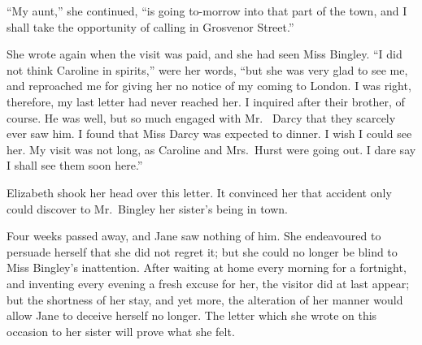 ``My aunt,'' she continued, ``is going to-morrow into that part of
the town, and I shall take the opportunity of calling in Grosvenor
Street.''

She wrote again when the visit was paid, and she had seen Miss
Bingley.  ``I did not think Caroline in spirits,'' were her words,
``but she was very glad to see me, and reproached me for giving
her no notice of my coming to London.  I was right, therefore,
my last letter had never reached her.  I inquired after their
brother, of course.  He was well, but so much engaged with Mr.\ %
Darcy that they scarcely ever saw him.  I found that Miss Darcy
was expected to dinner.  I wish I could see her.  My visit was
not long, as Caroline and Mrs.\ Hurst were going out.  I dare say
I shall see them soon here.''

Elizabeth shook her head over this letter.  It convinced her that
accident only could discover to Mr.\ Bingley her sister's being in
town.

Four weeks passed away, and Jane saw nothing of him.  She
endeavoured to persuade herself that she did not regret it; but
she could no longer be blind to Miss Bingley's inattention.  After
waiting at home every morning for a fortnight, and inventing
every evening a fresh excuse for her, the visitor did at last
appear; but the shortness of her stay, and yet more, the alteration
of her manner would allow Jane to deceive herself no longer.
The letter which she wrote on this occasion to her sister will
prove what she felt.


